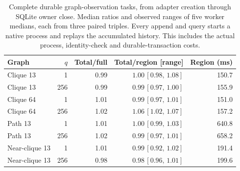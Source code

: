 \begin{table}[H]\centering\small
\caption{Complete durable graph-observation tasks, from adapter creation through SQLite owner close. Median ratios and observed ranges of five worker medians, each from three paired triples. Every append and query starts a native process and replays the accumulated history. This includes the actual process, identity-check and durable-transaction costs.}
\label{tab:graphobserverowner}
\begin{tabular}{lrrrr}\toprule
Graph & $q$ & Total/full & Total/region [range] & Region (ms)\\\midrule
Clique 13 & 1 & 0.99 & $1.00\,[0.98,\,1.08]$ & 150.7\\
Clique 13 & 256 & 0.99 & $0.99\,[0.97,\,1.00]$ & 155.9\\
Clique 64 & 1 & 1.01 & $0.99\,[0.97,\,1.01]$ & 151.0\\
Clique 64 & 256 & 1.02 & $1.06\,[1.02,\,1.07]$ & 157.2\\
Path 13 & 1 & 1.01 & $1.00\,[0.99,\,1.03]$ & 640.8\\
Path 13 & 256 & 1.02 & $0.99\,[0.97,\,1.01]$ & 658.2\\
Near-clique 13 & 1 & 1.01 & $0.99\,[0.92,\,1.02]$ & 191.4\\
Near-clique 13 & 256 & 0.98 & $0.98\,[0.96,\,1.01]$ & 199.6\\
\bottomrule\end{tabular}
\end{table}
